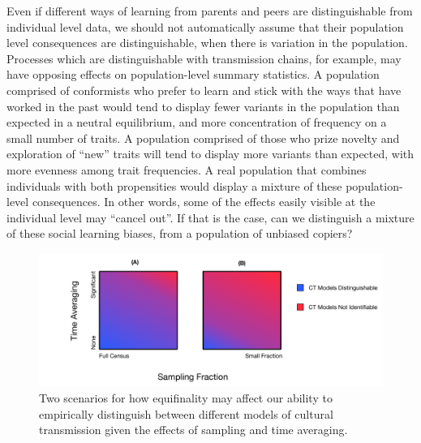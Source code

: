 Even if different ways of learning from parents and peers are distinguishable from individual level data, we should not automatically assume that their population level consequences are distinguishable, when there is variation in the population.  Processes which are distinguishable with transmission chains, for example, may have opposing effects on population-level summary statistics.  A population comprised of conformists who prefer to learn and stick with the ways that have worked in the past would tend to display fewer variants in the population than expected in a neutral equilibrium, and more concentration of frequency on a small number of traits.  A population comprised of those who prize novelty and exploration of ``new'' traits will tend to display more variants than expected, with more evenness among trait frequencies.  A real population that combines individuals with both propensities 
would display a mixture of these population-level consequences.  In other words, some of the effects easily visible at the individual level may ``cancel out''.  If that is the case, can we distinguish a mixture of these social learning biases, from a population of unbiased copiers?  

\begin{figure}[ht!]
  \centering
  \includegraphics[scale=0.5]{graphics/ctmixtures/equifinality-transmission-bias-scenarios.pdf}
  \caption{Two scenarios for how equifinality may affect our ability to empirically distinguish between different models of cultural transmission given the effects of sampling and time averaging.}
  \label{ctmixtures:fig:equifinality-scenarios}
  \end{figure}

